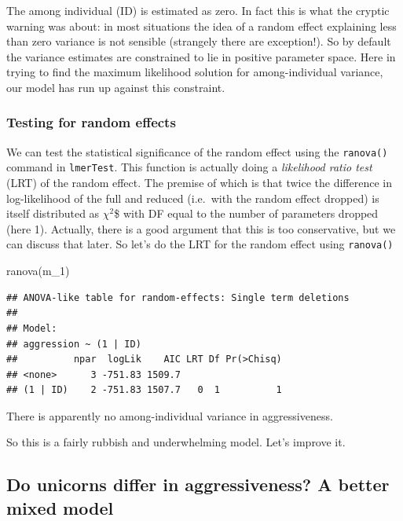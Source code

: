 \documentclass[
  12pt,
]{book}
\newenvironment{Shaded}{\begin{snugshade}}{\end{snugshade}}
\newcommand{\FunctionTok}[1]{\textcolor[rgb]{0.00,0.00,0.00}{#1}}
\newcommand{\NormalTok}[1]{#1}
\begin{document}
The among individual (ID) is estimated as zero. In fact this is what the cryptic warning was about: in most situations the idea of a random effect explaining less than zero variance is not sensible (strangely there are exception!). So by default the variance estimates are constrained to lie in positive parameter space. Here in trying to find the maximum likelihood solution for among-individual variance, our model has run up against this constraint.

\hypertarget{testing-for-random-effects}{%
\subsubsection{Testing for random effects}\label{testing-for-random-effects}}

We can test the statistical significance of the random effect using the \texttt{ranova()} command in \texttt{lmerTest}. This function is actually doing a \emph{likelihood ratio test} (LRT) of the random effect. The premise of which is that twice the difference in log-likelihood of the full and reduced (i.e.~with the random effect dropped) is itself distributed as \(\chi^2\)\$ with DF equal to the number of parameters dropped (here 1). Actually, there is a good argument that this is too conservative, but we can discuss that later. So let's do the LRT for the random effect using \texttt{ranova()}

\begin{Shaded}
\begin{Highlighting}[]
\FunctionTok{ranova}\NormalTok{(m\_1)}
\end{Highlighting}
\end{Shaded}

\begin{verbatim}
## ANOVA-like table for random-effects: Single term deletions
## 
## Model:
## aggression ~ (1 | ID)
##          npar  logLik    AIC LRT Df Pr(>Chisq)
## <none>      3 -751.83 1509.7                  
## (1 | ID)    2 -751.83 1507.7   0  1          1
\end{verbatim}

There is apparently no among-individual variance in aggressiveness.

So this is a fairly rubbish and underwhelming model. Let's improve it.

\hypertarget{do-unicorns-differ-in-aggressiveness-a-better-mixed-model}{%
\subsection{Do unicorns differ in aggressiveness? A better mixed model}\label{do-unicorns-differ-in-aggressiveness-a-better-mixed-model}}
\end{document}
